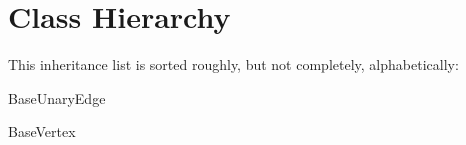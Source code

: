 \section{Class Hierarchy}
This inheritance list is sorted roughly, but not completely, alphabetically\+:\begin{DoxyCompactList}
\item Base\+Unary\+Edge\begin{DoxyCompactList}
\item {}
\end{DoxyCompactList}
\item Base\+Vertex\begin{DoxyCompactList}
\item {}
\end{DoxyCompactList}
\item {}
\end{DoxyCompactList}
